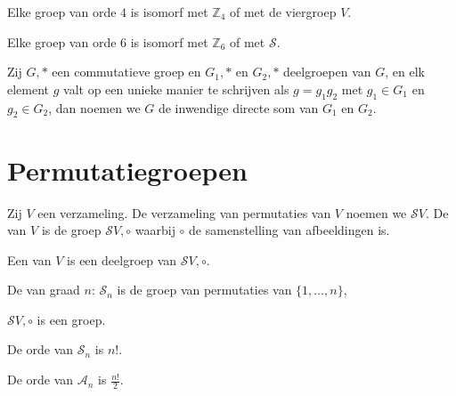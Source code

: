 \documentclass[main.tex]{subfiles}
\begin{document}
\begin{ei}
  Elke groep van orde $4$ is isomorf met $\mathbb{Z}_{4}$ of met de viergroep $V$.

\end{ei}

\begin{ei}
  Elke groep van orde $6$ is isomorf met $\mathbb{Z}_{6}$ of met $\mathcal{S}$. 

\end{ei}

\begin{de}
  Zij $G,*$ een commutatieve groep en $G_{1},*$ en $G_{2},*$ deelgroepen van $G$, en elk element $g$ valt op een unieke manier te schrijven als $g=g_{1}g_{2}$ met $g_{1}\in G_{1}$ en $g_{2}\in G_{2}$, dan noemen we $G$ de inwendige directe som van $G_{1}$ en $G_{2}$.
\end{de}

\section{Permutatiegroepen}
\label{sec:permutatiegroepen}

\begin{de}
  Zij $V$ een verzameling.
  De verzameling van permutaties van $V$ noemen we $\mathcal{S}V$.
  De  van $V$ is de groep $\mathcal{S}V, \circ$ waarbij $\circ$ de samenstelling van afbeeldingen is.
\end{de}

\begin{de}
  Een  van $V$ is een deelgroep van $\mathcal{S}V,\circ$.
\end{de}

\begin{de}
  De  van graad $n$: $\mathcal{S}_{n}$ is de groep van permutaties van $\{1,\dotsc,n\}$,
\end{de}

\begin{st}
  $\mathcal{S}V,\circ$ is een groep.

\end{st}

\begin{st}
  De orde van $\mathcal{S}_{n}$ is $n!$.

\end{st}

\begin{st}
  De orde van $\mathcal{A}_{n}$ is $\frac{n!}{2}$.

\end{st}
\end{document}
